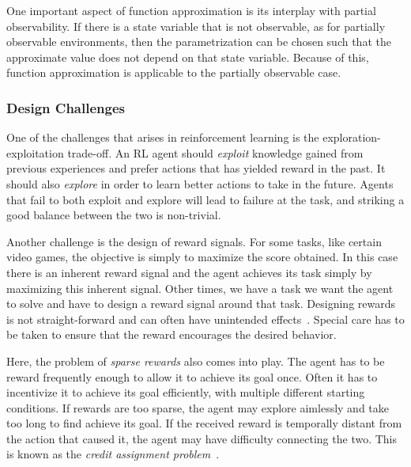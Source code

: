 One important aspect of function approximation is its interplay with partial observability.
If there is a state variable that is not observable, as for partially observable environments,
then the parametrization can be chosen such that the approximate value does not depend on that state variable.
Because of this, function approximation is applicable to the partially observable case.~\cite{sutton_reinforcement_2018}


\subsubsection{Design Challenges}


One of the challenges that arises in reinforcement learning is the exploration-exploitation trade-off.
An RL agent should \textit{exploit} knowledge gained from previous experiences and prefer actions that has yielded reward in the past.
It should also \textit{explore} in order to learn better actions to take in the future.
Agents that fail to both exploit and explore will lead to failure at the task, and striking a good balance between the two is non-trivial.~\cite{sutton_reinforcement_2018}

Another challenge is the design of reward signals.
For some tasks, like certain video games, the objective is simply to maximize the score obtained.
In this case there is an inherent reward signal and the agent achieves its task simply by maximizing this inherent signal.
Other times, we have a task we want the agent to solve and have to design a reward signal around that task.
Designing rewards is not straight-forward and can often have unintended effects~\cite{sutton_reinforcement_2018}.
Special care has to be taken to ensure that the reward encourages the desired behavior.

Here, the problem of \textit{sparse rewards} also comes into play.
The agent has to be reward frequently enough to allow it to achieve its goal once.
Often it has to incentivize it to achieve its goal efficiently, with multiple different starting conditions.
If rewards are too sparse, the agent may explore aimlessly and take too long to find achieve its goal.
If the received reward is temporally distant from the action that caused it, the agent may have difficulty connecting the two.
This is known as the \textit{credit assignment problem}~\cite{minsky_cap_1961}.

